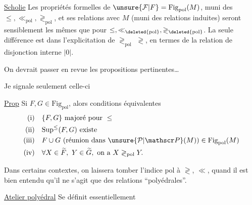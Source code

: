 \uline{Scholie} Les propriétés  formelles de $\unsure{\mathcal F|F}=\mathrm{Fig}_{\mathrm{pol}}(M)$, muni des $\leq,\ll_{\mathrm{pol}},\gtrless_{\mathrm{pol}}$, et ses relations avec $M$ (muni des relations induites) seront sensiblement les mêmes que pour $\leq,\ll_{\deleted{\mathrm{pol}}},\gtrless_{\deleted{\mathrm{pol}}}$.  La seule différence est dans l'explicitation de $\gtrless_{\mathrm{pol}}$  $\gtrless$, en termes de la relation de disjonction interne $|0|$.

On devrait passer en revue  les propositions pertinentes\ldots

Je signale seulement celle-ci

\uline{Prop} Si $F,G\in\mathrm{Fig}_{\mathrm{pol}}$, alors  conditions équivalentes
\[
\begin{aligned}
\text{(i)}\quad &\{F,G\}\text{ majoré pour }\leq\\
\text{(ii)}\quad &\mathrm{Sup}^{\leq}(F,G)\text{ existe}\\
\text{(iii)}\quad &F\cup G\text{ (réunion dans }\unsure{\mathcal P|\mathscr P}(M)\text{)}\in\mathrm{Fig}_{\mathrm{pol}}(M)\\
\text{(iv)}\quad &\forall X\in\widetilde F,\ Y\in\widetilde G,\text{ on a }X\gtrless_{\mathrm{pol}}Y.
\end{aligned}
\]

Dans certains contextes, on laissera tomber l'indice pol à $\gtrless$, $\ll$, quand il est bien entendu qu'il ne s'agit que des relations ``polyédrales''.

\uline{Atelier polyédral} Se définit essentiellement 
